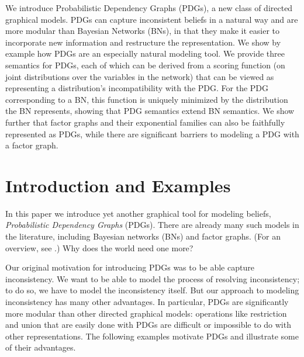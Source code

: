\label{chap:pdg-repr}

We introduce Probabilistic Dependency Graphs (PDGs), a new class of
directed graphical models. PDGs can capture inconsistent beliefs in a
natural way and are more modular than Bayesian Networks (BNs), in that
they make it easier to incorporate new information and restructure the  
representation. We show by example how PDGs are an especially natural
modeling tool.
We provide three semantics for PDGs, each of which can be derived from a
scoring function (on joint distributions over the
variables in the network) that can be viewed as representing a
distribution's incompatibility with the PDG.
For the PDG corresponding
to a BN, this function is uniquely minimized by the distribution the
BN represents, showing that PDG semantics extend BN semantics.  
We show further that factor graphs
and their exponential families
can also be faithfully represented as PDGs,
while there are significant barriers to modeling a PDG with a factor graph.

\section{Introduction and Examples}

In this paper we introduce yet another graphical
tool
for modeling beliefs,
\emph{Probabilistic Dependency Graphs} (PDGs). There are already many
such models in the literature, including Bayesian networks (BNs) and
factor graphs. (For an overview, see 
\citet{KF09}.)
Why does the world need one more?  

Our original motivation for introducing PDGs was to be able capture
inconsistency. We want to be able to model the process of resolving
inconsistency; to do so, we have to model the inconsistency itself. But our
approach to modeling inconsistency has many other advantages. In particular,
PDGs are significantly more modular than other directed graphical models:
operations like restriction and union that are easily done with PDGs are
difficult or impossible to do with other representations.
The following examples motivate PDGs and illustrate some of
their advantages.

